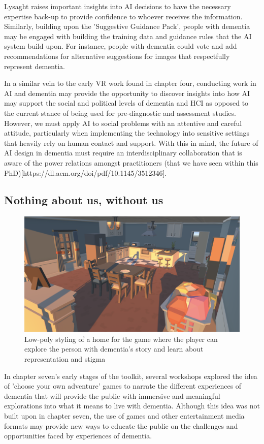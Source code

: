 Lysaght raises important insights into AI decisions to have the necessary expertise back-up to provide confidence to whoever receives the information. Similarly, building upon the 'Suggestive Guidance Pack', people with dementia may be engaged with building the training data and guidance rules that the AI system build upon. For instance, people with dementia could vote and add recommendations for alternative suggestions for images that respectfully represent dementia.

In a similar vein to the early VR work found in chapter four, conducting work in AI and dementia may provide the opportunity to discover insights into how AI may support the social and political levels of dementia and HCI as opposed to the current stance of being used for pre-diagnostic and assessment studies. However, we must apply AI to social problems with an attentive and careful attitude, particularly when implementing the technology into sensitive settings that heavily rely on human contact and support. With this in mind, the future of AI design in dementia must require an interdisciplinary collaboration that is aware of the power relations amongst practitioners (that we have seen within this PhD)[https://dl.acm.org/doi/pdf/10.1145/3512346].

\subsection{Nothing about us, without us}
\label{FutureStudyFour}
\begin{figure}[htp]
\centering
\includegraphics[width=1\linewidth]{Images/Discussion/Storytellling_Game.png}
\caption{Low-poly styling of a home for the game where the player can explore the person with dementia's story and learn about representation and stigma}
\label{fig:StorytellingLowPoly}
\end{figure}
In chapter seven's early stages of the toolkit, several workshops explored the idea of 'choose your own adventure' games to narrate the different experiences of dementia that will provide the public with immersive and meaningful explorations into what it means to live with dementia. Although this idea was not built upon in chapter seven, the use of games and other entertainment media formats may provide new ways to educate the public on the challenges and opportunities faced by experiences of dementia. 

